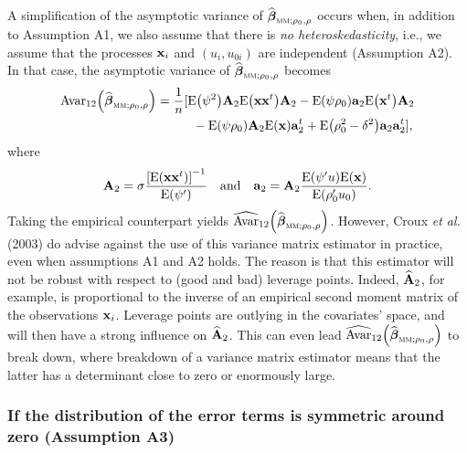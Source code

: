 A simplification of the asymptotic variance of $\sthat{\boldsymbol\beta%
}_{\stsc{MM};\rho_{0},\rho}$ occurs when, in addition to Assumption A1, we
also assume that there is \emph{no heteroskedasticity}, i.e., we assume that
the processes $\mathbf x_{i}$ and $\left(  u_{i},u_{0i}\right)  $ are
independent (Assumption A2). In that case, the asymptotic variance of
$\sthat{\boldsymbol\beta}_{\stsc{MM};\rho_{0},\rho}$ becomes
\begin{align*}
\mathrm{Avar}_{12}\left(  \sthat{\boldsymbol\beta}_{\stsc{MM};\rho
_{0},\rho}\right)   &  =\frac{1}{n}[\mathrm{E}\left(  \psi^{2}\right)
\mathbf{A}_{2}\mathrm{E}\left(  \mathbf{xx}^{t}\right)  \mathbf{A}%
_{2}-\mathrm{E}\left(  \psi\rho_{0}\right)  \mathbf{a}_{2}\mathrm{E}\left(
\stvec{x}^{t}\right)  \mathbf{A}_{2}\\
&  \hspace{0in}\hspace{1cm}-\mathrm{E}\left(  \psi\rho_{0}\right)
\mathbf{A}_{2}\mathrm{E}\left(  \stvec{x}\right)  \mathbf{a}_{2}%
^{t}+\mathrm{E}\left(  \rho_{0}^{2}-\delta^{2}\right)  \mathbf{a}%
_{2}\mathbf{a}_{2}^{t}],
\end{align*}
where
\[
\mathbf{A}_{2}=\sigma\frac{\left[  \mathrm{E}\left(  \mathbf{xx}^{t}\right)
\right]  ^{-1}}{\mathrm{E}\left(  \psi^{\prime}\right)  }\quad\text{and\quad
}\mathbf{a}_{2}=\mathbf{A}_{2}\frac{\mathrm{E}\left(  \psi^{\prime}u\right)
\mathrm{E}\left(  \stvec{x}\right)  }{\mathrm{E}\left(  \rho_{0}^{\prime
}u_{0}\right)  }.
\]
Taking the empirical counterpart yields $\sthat{\mathrm{Avar}}_{12}\left(
\sthat{\boldsymbol\beta}_{\stsc{MM};\rho_{0},\rho}\right)  $. However,
Croux \textit{et al.} (2003) do advise against the use of this variance matrix
estimator in practice, even when assumptions A1 and A2 holds. The reason is
that this estimator will not be robust with respect to (good and bad) leverage
points. Indeed, $\widehat{\mathbf{A}}_{2}$, for example, is proportional to
the inverse of an empirical second moment matrix of the observations
$\mathbf x_{i}$. Leverage points are outlying in the covariates' space, and
will then have a strong influence on $\widehat{\mathbf{A}}_{2}$. This can even
lead $\sthat{\mathrm{Avar}}_{12}\left(  \sthat{\boldsymbol\beta%
}_{\stsc{MM};\rho_{0},\rho}\right)  $ to break down, where breakdown of a
variance matrix estimator means that the latter has a determinant close to
zero or enormously large.

\subsubsection{If the distribution of the error terms is symmetric around zero (Assumption A3)}

